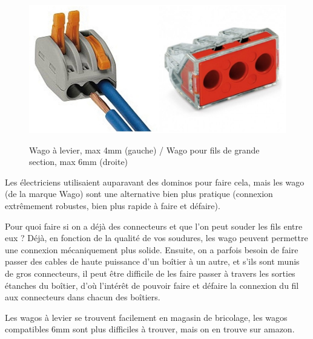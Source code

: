 \documentclass[a4paper, 11pt]{report}
\begin{document}
\begin{figure}[h]
\caption{Wago à levier, max 4mm (gauche) / Wago pour fils
de grande section, max 6mm (droite)}

\centering{}\includegraphics[width=0.5\textwidth]{images/wago_levier.jpg}\includegraphics[width=0.5\textwidth]{images/wago_6mm2.jpg}
\end{figure}

Les électriciens utilisaient auparavant des dominos pour faire cela,
mais les wago (de la marque Wago) sont une alternative bien plus pratique
(connexion extrêmement robustes, bien plus rapide à faire et défaire).

Pour quoi faire si on a déjà des connecteurs et que l'on peut souder
les fils entre eux ? Déjà, en fonction de la qualité de vos soudures,
les wago peuvent permettre une connexion mécaniquement plus solide.
Ensuite, on a parfois besoin de faire passer des cables de haute puissance
d'un boîtier à un autre, et s'ils sont munis de gros connecteurs,
il peut être difficile de les faire passer à travers les sorties étanches
du boîtier, d'où l'intérêt de pouvoir faire et défaire la connexion
du fil aux connecteurs dans chacun des boîtiers.

Les wagos à levier se trouvent facilement en magasin de bricolage,
les wagos compatibles 6mm sont plus difficiles à
trouver, mais on en trouve sur amazon.
\end{document}
